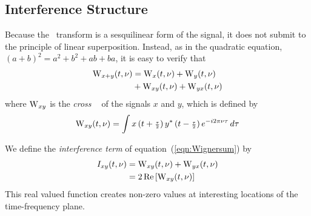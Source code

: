 \subsection{Interference Structure}%
Because the \WV\ transform is a sesquilinear form of the signal, it
does not submit to the principle of linear superposition.  Instead, as in the
quadratic equation, $(a+b)^2 = a^2 + b^2 + ab + ba$, it is easy to verify that
\begin{align}
  \operatorname{W}_{x+y}(t,\nu) &= \operatorname{W}_x(t,\nu) + \operatorname{W}_y(t,\nu)\nonumber \\
      &+ \operatorname{W}_{xy}(t,\nu) +\operatorname{W}_{yx}(t,\nu) \label{eqn:Wignersum} 
\end{align}
where $\operatorname{W}_{xy}$ is the \emph{cross \WT\ } of the signals $x$ and $y$, which is
defined by 
\begin{equation}
\label{eqn:crossWigner}
\operatorname{W}_{xy}(t,\nu) = \int x\left(t+{\scriptstyle \frac{\tau}{2}}\right) y^*\left(t-{\scriptstyle \frac{\tau}{2}}\right) e^{-i2\pi\nu\tau}\,d\tau 
\end{equation}


We define the \emph{interference term} of
equation~(\ref{eqn:Wignersum}) by
\begin{align*}
  I_{xy}(t,\nu) &= \operatorname{W}_{xy}(t,\nu) + \operatorname{W}_{yx}(t,\nu)\\
 &= 2\,\mbox{Re}\left[\operatorname{W}_{xy}(t,\nu)\right]
\end{align*}
This real valued function creates non-zero values at
interesting locations of the time-frequency %
plane. 

